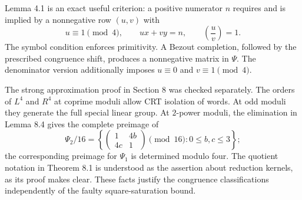 \documentclass[10pt]{article}
\begin{document}
Lemma 4.1 is an exact useful criterion: a positive numerator \(n\) requires and is implied by a nonnegative row \((u,v)\) with \[u\equiv1\pmod4,\qquad ux+vy=n,\qquad \left(\frac{u}{v}\right)=1.
 \tag{2.1}\] The symbol condition enforces primitivity. A Bezout completion, followed by the prescribed congruence shift, produces a nonnegative matrix in \(\Psi\). The denominator version additionally imposes \(u\equiv0\) and \(v\equiv1\pmod4\).\par
The strong approximation proof in Section 8 was checked separately. The orders of \(L^4\) and \(R^4\) at coprime moduli allow CRT isolation of words. At odd moduli they generate the full special linear group. At \(2\)-power moduli, the elimination in Lemma 8.4 gives the complete preimage of \[\Psi_2/16=\left\{\begin{pmatrix}1&4b\\4c&1\end{pmatrix}\pmod{16}:0\leq b,c\leq3\right\};\] the corresponding preimage for \(\Psi_1\) is determined modulo four. The quotient notation in Theorem 8.1 is understood as the assertion about reduction kernels, as its proof makes clear. These facts justify the congruence classifications independently of the faulty square-saturation bound.\par
\end{document}
